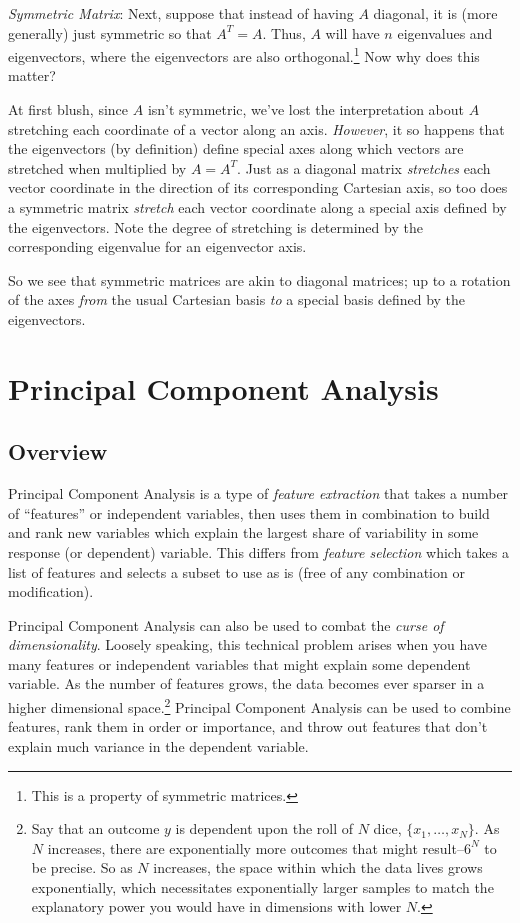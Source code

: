 \documentclass[12pt]{article}
\begin{document}
{\sl Symmetric Matrix}: Next, suppose that instead of having $A$ diagonal, it is (more generally) just symmetric so that $A^T = A$. Thus, $A$ will have $n$ eigenvalues and eigenvectors, where the eigenvectors are also orthogonal.\footnote{This is a property of symmetric matrices.} Now why does this matter? 

At first blush, since $A$ isn't symmetric, we've lost the interpretation about $A$ stretching each coordinate of a vector along an axis. \emph{However}, it so happens that the eigenvectors (by definition) define special axes along which vectors are stretched when multiplied by $A=A^T$. Just as a diagonal matrix \emph{stretches} each vector coordinate in the direction of its corresponding Cartesian axis, so too does a symmetric matrix \emph{stretch} each vector coordinate along a special axis defined by the eigenvectors. Note the degree of stretching is determined by the corresponding eigenvalue for an eigenvector axis. 

So we see that symmetric matrices are akin to diagonal matrices;
up to a rotation of the axes \emph{from} the usual Cartesian basis \emph{to} a special basis defined by the eigenvectors.




\section{Principal Component Analysis}
\subsection{Overview}

Principal Component Analysis is a type of \emph{feature extraction}
that takes a number of ``features'' or independent variables, then 
uses them in combination to build and rank new variables which 
explain the largest share of variability in some response (or
dependent) variable. This differs from \emph{feature selection}
which takes a list of features and selects a subset to use as is
(free of any combination or modification).

Principal Component Analysis can also be used to combat the 
\emph{curse of dimensionality}.  Loosely speaking, this technical
problem arises when you have many features or independent variables
that might explain some dependent variable. As the number of 
features grows, the data becomes ever sparser in a higher 
dimensional space.\footnote{Say that an outcome $y$ is dependent
upon the roll of $N$ dice, $\{x_1, \ldots, x_N\}$. As $N$ increases, 
there are exponentially more outcomes that might 
result--$6^N$ to be precise. So as $N$ increases, the space within 
which the data lives grows exponentially, which necessitates 
exponentially larger samples to match the explanatory power you
would have in dimensions with lower $N$.}
Principal Component Analysis can be used to combine features, rank
them in order or importance, and throw out features that don't
explain much variance in the dependent variable.
\end{document}
